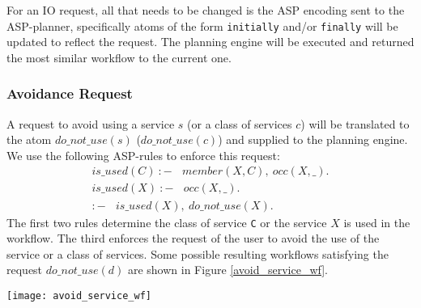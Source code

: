 \documentclass{new_tlp}
\begin{document}
{For an IO request, all that needs to be changed is the ASP encoding sent to the ASP-planner, specifically atoms of the form \texttt{\small initially} and/or \texttt{\small finally} will be updated to reflect the request. The planning engine will be executed and returned the most similar workflow to the current one.  




\subsubsection{Avoidance Request}

A request to avoid using a service $s$ (or a class of services $c$) will be translated to the atom $do\_not\_use(s)$ 
($do\_not\_use(c)$) and supplied to the planning engine. 
We use the following ASP-rules to enforce this request:  
%
\begin{align}
  is\_used(C)\: {:}{-} \:\:\:\: member(X, C), \: occ(X, \_). \label{r1}\\
  is\_used(X)\: {:}{-} \:\:\:\: occ(X, \_). \label{r3}\\  
  {:}{-} \:\:\:\: is\_used(X), \: do\_not\_use(X). \label{r3}
\end{align}
%
The first two rules determine the class of service \texttt{C} or the service $X$ is used in the workflow. 
The third enforces the request of the user to avoid the use of the service or a class of services.  
Some possible resulting workflows satisfying the request $do\_not\_use(d)$ are shown in Figure \ref{avoid_service_wf}.
%
%
\begin{figure*}[t]
		\centerline{\texttt{[image: avoid\_service\_wf]}}
	\caption{Some updated workflows with avoidance the service $d$}
	\label{avoid_service_wf}
\end{figure*}
%
}
\end{document}
